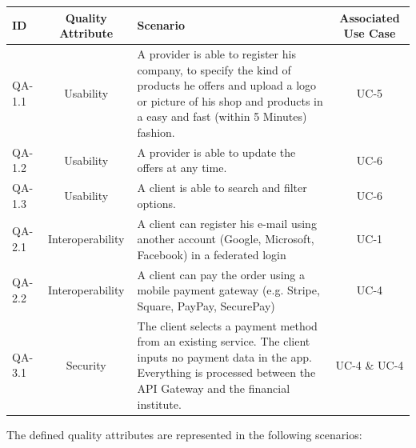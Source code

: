 \begin{table}[H]
    \begin{tabularx}{\textwidth}{lcXc}
        \toprule
        ID & Quality Attribute & Scenario & Associated Use Case  \\
        \midrule
        QA-1.1 & Usability & A \gls{provider} is able to register his company, to specify the kind of products he offers 
        and upload a logo or picture of his shop and products in a easy and fast (within 5 Minutes) fashion. & UC-5 \\
        QA-1.2 & Usability & A \gls{provider} is able to update the offers at any time. &  UC-6 \\
        QA-1.3 & Usability & A \gls{client} is able to search and filter options. &  UC-6 \\
        QA-2.1 & Interoperability & A \gls{client} can register his e-mail using another account (Google, Microsoft, Facebook)
        in a \gls{federated login} & UC-1 \\
        QA-2.2 & Interoperability & A \gls{client} can pay the order using a \gls{mobile payment gateway} (e.g. Stripe, Square, PayPay, SecurePay) & UC-4 \\
        QA-3.1 & Security & The \gls{client} selects a payment method from an existing service. The client inputs no payment data 
        in the app. Everything is processed between the \gls{API Gateway} and the financial institute. & UC-4 \& UC-4 \\
        \bottomrule
    \end{tabularx}
\end{table}

\newpage
The defined quality attributes are represented in the following scenarios:


